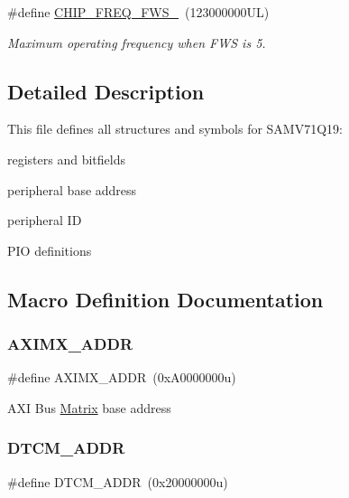 \begin{DoxyCompactItemize}
\mbox{\label{group__SAMV71Q19__definitions_ga3b66824f858591135877b369f98d48a5}} 
\#define \mbox{\hyperlink{group__SAMV71Q19__definitions_ga3b66824f858591135877b369f98d48a5}{C\+H\+I\+P\+\_\+\+F\+R\+E\+Q\+\_\+\+F\+W\+S\+\_}}~(123000000\+U\+L)
\begin{DoxyCompactList}\small\item\em Maximum operating frequency when F\+WS is 5. \end{DoxyCompactList}\end{DoxyCompactItemize}


\subsection{Detailed Description}
This file defines all structures and symbols for S\+A\+M\+V71\+Q19\+:
\begin{DoxyItemize}
\item registers and bitfields
\item peripheral base address
\item peripheral ID
\item P\+IO definitions 
\end{DoxyItemize}

\subsection{Macro Definition Documentation}
\mbox{\label{group__SAMV71Q19__definitions_ga2fb7cc681bf5e7fbce5e3635b72a330a}} 
\subsubsection{\texorpdfstring{AXIMX\_ADDR}{AXIMX\_ADDR}}
{\footnotesize\ttfamily \#define A\+X\+I\+M\+X\+\_\+\+A\+D\+DR~(0x\+A0000000u)}

A\+XI Bus \mbox{\hyperlink{structMatrix}{Matrix}} base address \mbox{\label{group__SAMV71Q19__definitions_ga26626a425f7ebb3a0c2dbc276f0d9f78}} 
\subsubsection{\texorpdfstring{DTCM\_ADDR}{DTCM\_ADDR}}
{\footnotesize\ttfamily \#define D\+T\+C\+M\+\_\+\+A\+D\+DR~(0x20000000u)}

